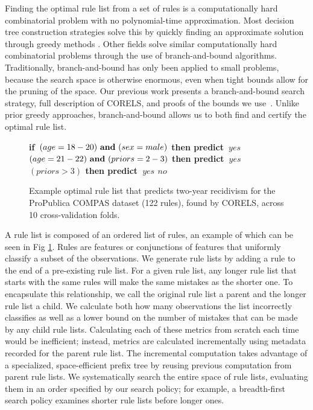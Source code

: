 \documentclass[format=sigconf]{acmart}
\def\bif{\bf if~}
\def\belif{{\bf else if~}}
\def\bthen{{\bf then predict~}}
\def\belse{{\bf else predict~}}
\def\band{{\bf ~and~}}
\begin{document}
Finding the optimal rule list from a set of rules is a computationally hard combinatorial problem with no polynomial-time approximation.
Most decision tree construction strategies solve this by quickly finding an approximate solution through greedy  methods \citep{BreimanFrOlSt84, Quinlan93}.
Other fields solve similar computationally hard combinatorial problems through the use of branch-and-bound algorithms\citep{Clausen99}.
Traditionally, branch-and-bound has only been applied to small problems, because the search space is otherwise enormous, even when tight bounds allow for the pruning of the space.
Our previous work presents a branch-and-bound search strategy, full description of CORELS, and proofs of the bounds we use~\cite{AngelinoLaAlSeRu17, ErtekinRu17}.
Unlike prior greedy approaches, branch-and-bound allows us to both find and certify the optimal rule list.

\begin{figure}[b!]
\vspace{-1mm}
\begin{algorithmic}
\State \bif $(age = 18-20) \band (sex = male)$ \bthen $yes$
\State \belif $(age = 21-22) \band (priors = 2-3)$ \bthen $yes$
\State \belif $(priors > 3)$ \bthen $yes$
\State \belse $no$
\end{algorithmic}
\vspace{-2mm}
\caption{Example optimal rule list that predicts two-year recidivism for the ProPublica COMPAS dataset (122 rules), found by CORELS, across 10 cross-validation folds.
%
}
\label{fig:recidivism}
\end{figure}

A rule list is composed of an ordered list of rules, an example of which can be seen in Fig \ref{fig:recidivism}.
Rules are features or conjunctions of features that uniformly classify a subset of the observations.
We generate rule lists by adding a rule to the end of a pre-existing rule list.
For a given rule list, any longer rule list that starts with the same rules will make the same mistakes as the shorter one.
To encapsulate this relationship, we call the original rule list a parent and the longer rule list a child.
We calculate both how many observations the list incorrectly classifies as well as a lower bound on the number of mistakes that can be made by any child rule lists.
Calculating each of these metrics from scratch each time would be inefficient; instead, metrics are calculated incrementally using metadata recorded for the parent rule list.
The incremental computation takes advantage of a specialized, space-efficient prefix tree by reusing previous computation from parent rule lists.
We systematically search the entire space of rule lists, evaluating them in an order specified by our search policy; for example, a breadth-first search policy examines shorter rule lists before longer ones.
\end{document}
